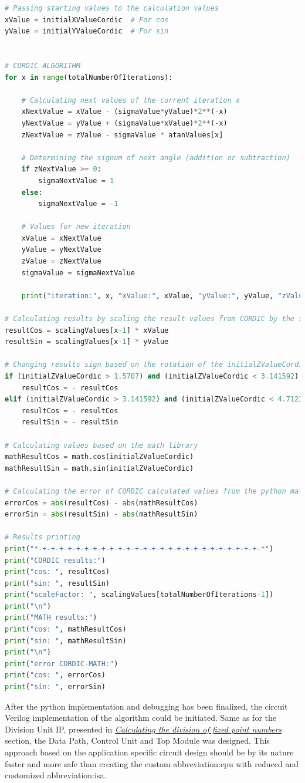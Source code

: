 \documentclass[a4paper, twoside, 11pt]{article}
\begin{document}
\begin{lstlisting}[language={python}, caption={Python code of \gls{abbreviation:cordic} implementation.}, label= {lst:python-cordic}]
# Passing starting values to the calculation values
xValue = initialXValueCordic  # For cos
yValue = initialYValueCordic  # For sin


# CORDIC ALGORITHM
for x in range(totalNumberOfIterations):

    # Calculating next values of the current iteration x
    xNextValue = xValue - (sigmaValue*yValue)*2**(-x)
    yNextValue = yValue + (sigmaValue*xValue)*2**(-x)
    zNextValue = zValue - sigmaValue * atanValues[x]

    # Determining the signum of next angle (addition or subtraction)
    if zNextValue >= 0:
        sigmaNextValue = 1
    else:
        sigmaNextValue = -1

    # Values for new iteration
    xValue = xNextValue
    yValue = yNextValue
    zValue = zNextValue
    sigmaValue = sigmaNextValue

    print("iteration:", x, "xValue:", xValue, "yValue:", yValue, "zValue:", zValue, "sigmaValue:", sigmaValue, "\n")

# Calculating results by scaling the result values from CORDIC by the scalingValue which depends on number of iterations which were made
resultCos = scalingValues[x-1] * xValue
resultSin = scalingValues[x-1] * yValue

# Changing results sign based on the rotation of the initialZValueCordic
if (initialZValueCordic > 1.5707) and (initialZValueCordic < 3.141592):
    resultCos = - resultCos
elif (initialZValueCordic > 3.141592) and (initialZValueCordic < 4.7123):
    resultCos = - resultCos
    resultSin = - resultSin

# Calculating values based on the math library
mathResultCos = math.cos(initialZValueCordic)
mathResultSin = math.sin(initialZValueCordic)

# Calculating the error of CORDIC calculated values from the python math functions
errorCos = abs(resultCos) - abs(mathResultCos)
errorSin = abs(resultSin) - abs(mathResultSin)

# Results printing
print("*-+-+-+-+-+-+-+-+-+-+-+-+-+-+-+-+-+-+-+-+-+-+-+-+-+-+-*")
print("CORDIC results:")
print("cos: ", resultCos)
print("sin: ", resultSin)
print("scaleFactor: ", scalingValues[totalNumberOfIterations-1])
print("\n")
print("MATH results:")
print("cos: ", mathResultCos)
print("sin: ", mathResultSin)
print("\n")
print("error CORDIC-MATH:")
print("cos: ", errorCos)
print("sin: ", errorSin)
\end{lstlisting}

\par
After the python implementation and debugging has been finalized, the circuit Verilog implementation of the algorithm could be initiated. Same as for the Division Unit IP, presented in \hyperref[sec:calculating-the-division-of-fixed-point-numbers]{\textit{Calculating the division of fixed point numbers}} section, the Data Path, Control Unit and Top Module was designed. This approach based on the application specific circuit design should be by its nature faster and more safe than creating the custom \gls{abbreviation:cpu} with reduced and customized \gls{abbreviation:isa}.
\end{document}

